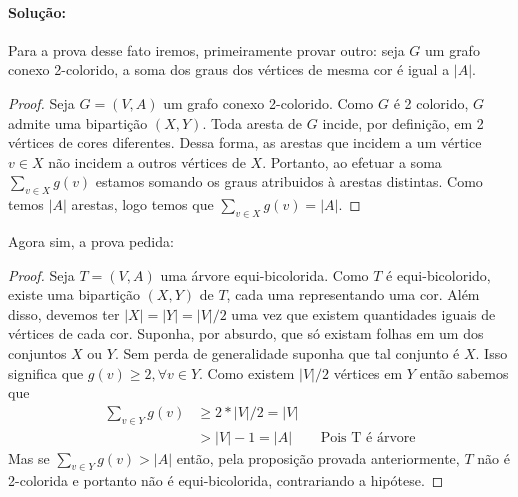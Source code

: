 \documentclass[11pt,a4paper,notitlepage]{exam}
\begin{document}
\paragraph{Solução:} Para a prova desse fato iremos, primeiramente provar outro: seja $G$ um grafo conexo 2-colorido, a soma dos graus dos vértices de mesma cor é igual a $|A|$.
\begin{proof}
  Seja $G = (V, A)$ um grafo conexo 2-colorido. Como $G$ é 2 colorido, $G$ admite uma bipartição $(X, Y)$. Toda aresta de $G$ incide, por definição, em 2 vértices de cores diferentes. Dessa forma, as arestas que incidem a um vértice $v \in X$ não incidem a outros vértices de $X$. Portanto, ao efetuar a soma $\sum_ {v \in X}g(v)$ estamos somando os graus atribuidos à arestas distintas. Como temos $|A|$ arestas, logo temos que $\sum_ {v \in X}g(v) = |A|$.
\end{proof}
Agora sim, a prova pedida:
\begin{proof}
  Seja $T = (V, A)$ uma árvore equi-bicolorida. Como $T$ é equi-bicolorido, existe uma bipartição $(X, Y)$ de $T$, cada uma representando uma cor. Além disso, devemos ter $|X|=|Y|=|V|/2$ uma vez que existem quantidades iguais de vértices de cada cor.  Suponha, por absurdo, que só existam folhas em um dos conjuntos $X$ ou $Y$. Sem perda de generalidade suponha que tal conjunto é $X$. Isso significa que $g(v) \geq 2, \forall v \in Y$. Como existem $|V|/2$ vértices em $Y$ então sabemos que
  \begin{align*}
    \sum_{v \in Y}g(v) & \geq 2*|V|/2 = |V|                             \\
                       & > |V|-1 = |A|      &  & \text{Pois T é árvore}
  \end{align*}
  Mas se $\sum_{v \in Y}g(v) > |A|$ então, pela proposição provada anteriormente, $T$ não é 2-colorida e portanto não é equi-bicolorida, contrariando a hipótese.
\end{proof}
\end{document}
